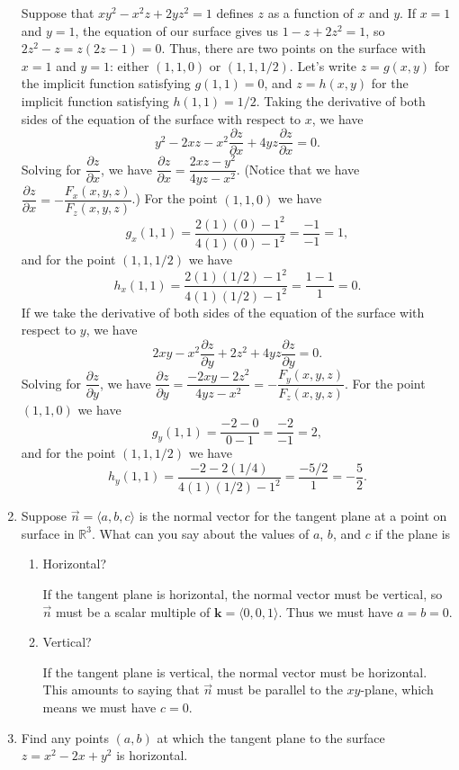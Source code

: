 \documentclass[letterpaper,12pt]{article}
\newcommand{\R}{\mathbb{R}}
\renewcommand{\k}{\mathbf{k}}
\newcommand{\pd}[2]{\dfrac{\partial #1}{\partial #2}}
\begin{document}
\begin{enumerate}
Suppose that $xy^2-x^2z+2yz^2=1$ defines $z$ as a function of $x$ and $y$. If $x=1$ and $y=1$, the equation of our surface gives us $1-z+2z^2=1$, so $2z^2-z=z(2z-1)=0$. Thus, there are two points on the surface with $x=1$ and $y=1$: either $(1,1,0)$ or $(1,1,1/2)$. Let's write $z=g(x,y)$ for the implicit function satisfying $g(1,1)=0$, and $z=h(x,y)$ for the implicit function satisfying $h(1,1)=1/2$. Taking the derivative of both sides of the equation of the surface with respect to $x$, we have
\[
 y^2-2xz-x^2\pd{z}{x}+4yz\pd{z}{x}=0.
\]
Solving for $\pd{z}{x}$, we have $\pd{z}{x} = \dfrac{2xz-y^2}{4yz-x^2}$. (Notice that we have $\pd{z}{x} = -\dfrac{F_x(x,y,z)}{F_z(x,y,z)}$.) For the point $(1,1,0)$ we have
\[
 g_x(1,1) = \dfrac{2(1)(0)-1^2}{4(1)(0)-1^2} = \dfrac{-1}{-1} = 1,
\]
and for the point $(1,1,1/2)$ we have
\[
 h_x(1,1) = \dfrac{2(1)(1/2)-1^2}{4(1)(1/2)-1^2} = \dfrac{1-1}{1} = 0.
\]
If we take the derivative of both sides of the equation of the surface with respect to $y$, we have
\[
 2xy-x^2\pd{z}{y}+2z^2+4yz\pd{z}{y} = 0.
\]
Solving for $\pd{z}{y}$, we have $\pd{z}{y} = \dfrac{-2xy-2z^2}{4yz-x^2} = -\dfrac{F_y(x,y,z)}{F_z(x,y,z)}$. For the point $(1,1,0)$ we have
\[
 g_y(1,1) = \dfrac{-2-0}{0-1} = \dfrac{-2}{-1} = 2,
\]
and for the point $(1,1,1/2)$ we have
\[
 h_y(1,1) = \dfrac{-2-2(1/4)}{4(1)(1/2)-1^2} = \dfrac{-5/2}{1} = -\dfrac{5}{2}.
\]


 \item Suppose $\vec{n} = \langle a,b,c\rangle$ is the normal vector for the tangent plane at a point on surface in $\R^3$. What can you say about the values of $a$, $b$, and $c$ if the plane is
\begin{enumerate}
 \item Horizontal?

\medskip

If the tangent plane is horizontal, the normal vector must be vertical, so $\vec{n}$ must be a scalar multiple of $\k = \langle 0,0,1\rangle$. Thus we must have $a=b=0$.

\medskip

 \item Vertical?

\medskip

If the tangent plane is vertical, the normal vector must be horizontal. This amounts to saying that $\vec{n}$ must be parallel to the $xy$-plane, which means we must have $c=0$.

\medskip

\end{enumerate}
 \item Find any points $(a,b)$ at which the tangent plane to the surface $z=x^2-2x+y^2$ is horizontal.


\end{enumerate}
\end{document}
